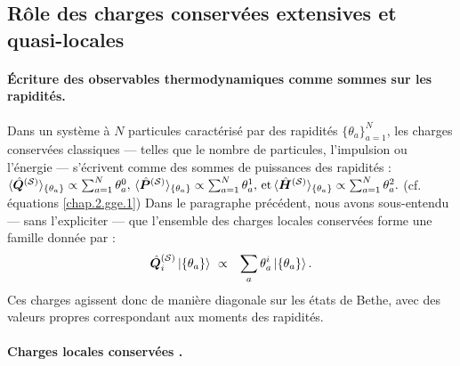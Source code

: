 




%
\subsection{Rôle des charges conservées extensives et quasi-locales}

\paragraph{Écriture des observables thermodynamiques comme sommes sur les rapidités.}

Dans un système à $N$ particules caractérisé par des rapidités $\{ \theta_a \}_{a = 1}^N$, les charges conservées classiques — telles que le nombre de particules, l’impulsion ou l’énergie — s’écrivent comme des sommes de puissances des rapidités :
\(
	\langle \hat{\bm{Q}}^{(\mathcal{S})}  \rangle_{\{ \theta_a\} } \propto \sum_{a = 1}^N \theta_a^0 , \,  \langle \hat{\bm{P}}^{(\mathcal{S})}  \rangle_{\{ \theta_a\} } \propto \sum_{a = 1}^N \theta_a^1  ,\,  \mbox{et} \, \langle \hat{\bm{H}}^{(\mathcal{S})}  \rangle_{\{ \theta_a\} } \propto \sum_{a = 1}^N \theta_a^2 .	
\)
(cf. équations \eqref{chap.2.gge.1})
Dans le paragraphe précédent, nous avons sous-entendu — sans l’expliciter — que l’ensemble des charges locales conservées forme une famille donnée par :
\begin{eqnarray}
	\operator{Q}_i^{(\mathcal{S})} \ket{\{\theta_a\} } & \propto & \sum_a \theta_a^i \ket{\{\theta_a\} }.
\end{eqnarray}
Ces charges agissent donc de manière diagonale sur les états de Bethe, avec des valeurs propres correspondant aux moments des rapidités.
\paragraph{Charges locales conservées .\label{sec:charges-gen}}

